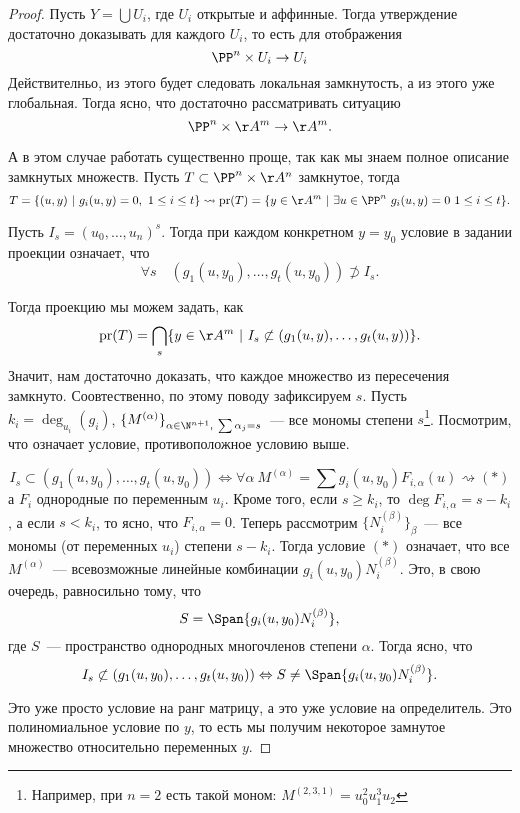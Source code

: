 \begin{proof}
		Пусть $Y = \bigcup U_i$, где $U_i$ открытые и аффинные. Тогда утверждение достаточно доказывать для каждого $U_i$, то есть для отображения 
		\[
		 	\PP^n \times U_i \to U_i
		 \] 
		 Действителньо, из этого будет следовать локальная замкнутость, а из этого уже глобальная. Тогда ясно, что достаточно рассматривать ситуацию
		 \[
		 	\PP^n \times \AA^m \to \AA^m.
		 \]

		 А в этом случае работать существенно проще, так как мы знаем полное описание замкнутых множеств. Пусть $T \subset \PP^n \times \AA^n$ замкнутое, тогда 
		 \[
		 	T = \{ (u, y) \ \vert \ g_i(u, y) = 0, \ 1 \le i \le t \} \rightsquigarrow \mathrm{pr}(T) = \{ y \in \AA^m \ \vert \ \exists u \in \PP^n \ g_i(u, y) = 0 \ 1 \le i \le t \}. 
		 \]

		 Пусть $I_{s} = (u_0, \ldots, u_n)^s$. Тогда при каждом конкретном  $y = y_{0}$ условие в задании проекции означает, что 
		 \[
		 	\forall s \quad (g_{1}(u, y_{0}), \ldots, g_{t}(u, y_{0})) \not\supset I_{s}.
		 \]

		 Тогда проекцию мы можем задать, как 
		 \[
		 	\mathrm{pr}(T) = \bigcap_{s} \{ y \in \AA^m \ \vert \ I_{s} \not\subset (g_{1}(u, y), \ldots, g_{t}(u, y)) \}.
		 \]
		 Значит, нам достаточно доказать, что каждое множество из пересечения замкнуто. 	Соовтественно, по этому поводу зафиксируем $s$. Пусть $k_i = \deg_{u_i}(g_{i})$, $\{ M^{(\alpha)}\}_{\alpha \in \N^{n + 1}, \ \sum \alpha_j = s}$~--- все мономы степени $s$\footnote{Например, при $n =2$ есть такой моном: $M^{(2, 3, 1)} = u_0^2 u_1^3 u_2$}. Посмотрим, что означает условие, противоположное условию выше. 

		 \[
		 	I_{s} \subset (g_{1}(u, y_{0}), \ldots, g_{t}(u, y_{0})) \Leftrightarrow \forall \alpha \  M^{(\alpha)} = \sum g_i(u, y_0) F_{i, \alpha}(u) \rightsquigarrow (*)
		 \]
		 а $F_i$ однородные по переменным $u_i$. Кроме того, если $s \ge k_i$, то $\deg{F_{i, \alpha}} = s  - k_i$, а если $s < k_i$, то ясно, что $F_{i, \alpha} = 0$. Теперь рассмотрим $\{ N_i^{(\beta)} \}_{\beta}$~--- все мономы (от переменных $u_i$) степени $s - k_i$.  Тогда условие $(*)$ означает, что все $M^{(\alpha)}$~--- всевозможные линейные комбинации $g_i(u, y_0) N_i^{(\beta)}$. Это, в свою очередь, равносильно тому, что 
		 \[
		 	S = \Span\{ g_{i}(u, y_0)N_i^{(\beta)} \},
		 \]
		 где $S$~--- пространство однородных многочленов степени $\alpha$. Тогда ясно, что  
		 \[
		 	I_{s} \not\subset (g_{1}(u, y_0), \ldots, g_{t}(u, y_0)) \Leftrightarrow S \neq \Span\{ g_{i}(u, y_0)N_i^{(\beta)} \}.
		 \]

		 Это уже просто условие на ранг матрицу, а это уже условие на определитель. Это полиномиальное условие по $y$, то есть мы получим некоторое замнутое множество относительно переменных $y$. 
	\end{proof}

